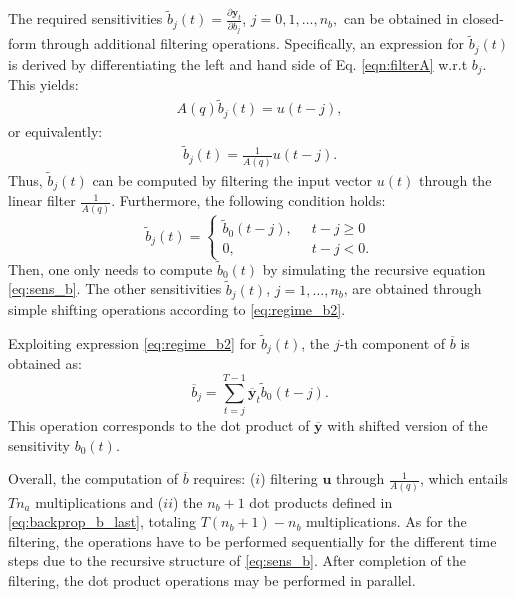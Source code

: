\documentclass{article}
\newcommand{\q}{q} %
\newcommand{\A}{A} %
\newcommand{\ac}{a} %
\newcommand{\bb}{b} %
\newcommand{\sens}[1]{\tilde{#1}}
\newcommand{\adjoint}[1]{\overline{#1}}
\newcommand{\tvec}[1]{\mathbf{#1}}
\newcommand{\nsamp}{T}
\newcommand{\pdiff}[2]{\frac{\partial #1}{\partial #2}}
\begin{document}
The required sensitivities  $\sens{\bb}_j(t)  = \pdiff{\tvec{y}_t}{b_j}$, $j=0,1,\dots,n_\bb,$ can be obtained in closed-form through additional filtering operations\cite{ljung:1999system}. Specifically, an expression for $\sens{\bb}_j(t)$  is derived by differentiating 
the left and hand side of Eq. \eqref{eqn:filterA} w.r.t $\bb_j$. This yields:
\begin{align}  \label{eq:sens_b}
\A(\q) \sens{\bb}_j(t)  = u(t-j),
\end{align}
or equivalently: 
\begin{align}  \label{eq:sens_b2}
\sens{\bb}_j(t)  = \frac{1}{\A(\q)}u(t-j).
\end{align}
Thus, $\sens{\bb}_j(t)$ can be computed by filtering the input vector $u(t)$  through the linear filter $ \displaystyle \frac{1}{\A(\q)}$. Furthermore, the following condition holds: 
\begin{equation}
\label{eq:regime_b2}
\sens{\bb}_{j}(t) = \begin{cases}
\sens{\bb}_0(t-j), \;\;&t-j \geq 0\\
0,           \;\; & t-j < 0.
\end{cases}
\end{equation}
Then, one only needs to compute $ \sens{\bb}_0(t)$ by simulating  the recursive  equation   \eqref{eq:sens_b}. The other sensitivities $ \sens{\bb}_j(t)$, $j=1,\ldots,n_\bb$, are  obtained through simple shifting operations according to \eqref{eq:regime_b2}.

Exploiting expression \eqref{eq:regime_b2} for $\tilde b_j(t)$, the $j$-th component of $\adjoint{\bb}$ is obtained as:
\begin{equation}
\label{eq:backprop_b_last}
\adjoint{\bb}_j = \sum_{t=j}^{\nsamp-1} \adjoint{\tvec{y}}_t \sens{b}_0(t-j).
\end{equation}
This operation corresponds to the dot product of $\adjoint{\tvec{y}}$ with shifted version of the sensitivity $b_0(t)$.%

Overall, the  computation of  $\adjoint{\bb}$ requires: ($i$) filtering $\tvec{u}$ through $\frac{1}{A(\q)}$, which entails $\nsamp n_\ac$ multiplications and ($ii$) 
the $n_{\bb}\!+\!1$ dot products defined in \eqref{eq:backprop_b_last}, totaling $\nsamp(n_{\bb}\!+\!1)- n_\bb$ multiplications. 
As for the filtering, the operations have to be performed sequentially for the different time steps due to the 
recursive structure of \eqref{eq:sens_b}. After completion of the filtering, the dot product operations may be performed in parallel.
\end{document}
